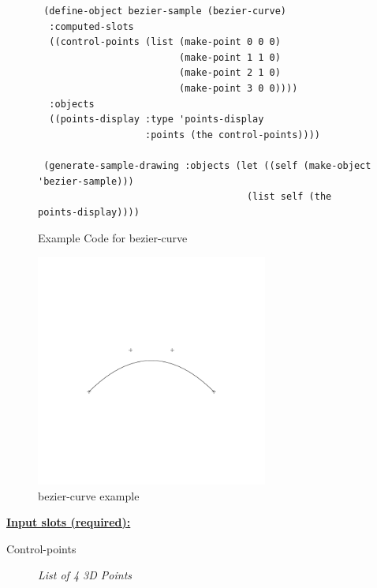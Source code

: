 \documentclass [11pt]{book}
\begin{document}
\begin{itemize}
\begin{figure}
\begin{lrbox}{\boxedverb}
\begin{minipage}{\linewidth}
{\begin{verbatim}
 (define-object bezier-sample (bezier-curve)
  :computed-slots
  ((control-points (list (make-point 0 0 0)
                         (make-point 1 1 0)
                         (make-point 2 1 0)
                         (make-point 3 0 0))))
  :objects
  ((points-display :type 'points-display
                   :points (the control-points))))

 (generate-sample-drawing :objects (let ((self (make-object 'bezier-sample)))
                                     (list self (the points-display))))

\end{verbatim}}
\end{minipage}
\end{lrbox}
\fbox{\usebox{\boxedverb}}

\caption{Example Code for bezier-curve}

\label{fig:example-code-bezier-curve}

\end{figure}

\begin{figure}
\begin{center}
\includegraphics[width=3in,height=3in]{../images/example-bezier-curve.pdf}
\end{center}

\caption{bezier-curve example}

\label{fig:bezier-curve}

\end{figure}





\textbf{
\underline{Input slots (required):}}

\begin{description}

\item [Control-points]
\emph{List of 4 3D Points}


\end{description}
\end{itemize}
\end{document}
